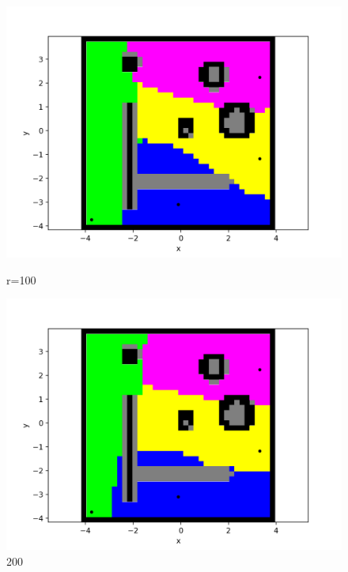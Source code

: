 \documentclass{beamer}
\begin{document}
\begin{frame}
\begin{figure}[H]
    		\begin{minipage}{0.3\textwidth}{}
    			\includegraphics[width=\linewidth]{DARPImages/100}
   				\caption{r=100}
    		\end{minipage}
    		\hspace{\fill} %
    		\begin{minipage}{0.3\textwidth}
    			\includegraphics[width=\linewidth]{DARPImages/200}
    			\caption{200}
    		\end{minipage}
    		\hspace{\fill} %
   			\begin{minipage}{0.3\textwidth}

\end{minipage}
\end{figure}
\end{frame}
\end{document}

